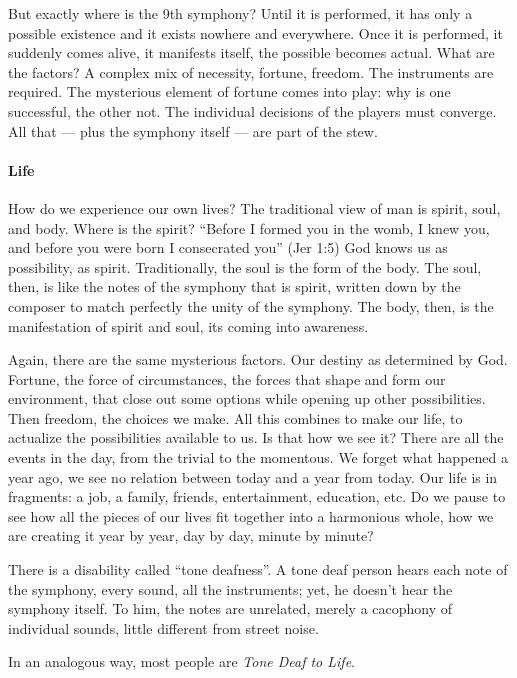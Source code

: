 But exactly where is the 9th symphony? Until it is performed, it has only a possible existence and it exists nowhere and everywhere. Once it is performed, it suddenly comes alive, it manifests itself, the possible becomes actual. What are the factors? A complex mix of necessity, fortune, freedom. The instruments are required. The mysterious element of fortune comes into play: why is one successful, the other not. The individual decisions of the players must converge. All that --- plus the symphony itself --- are part of the stew.

\paragraph{Life}


How do we experience our own lives? The traditional view of man is spirit, soul, and body. Where is the spirit? ``Before I formed you in the womb, I knew you, and before you were born I consecrated you'' (Jer 1:5) God knows us as possibility, as spirit. Traditionally, the soul is the form of the body. The soul, then, is like the notes of the symphony that is spirit, written down by the composer to match perfectly the unity of the symphony. The body, then, is the manifestation of spirit and soul, its coming into awareness.

Again, there are the same mysterious factors. Our destiny as determined by God. Fortune, the force of circumstances, the forces that shape and form our environment, that close out some options while opening up other possibilities. Then freedom, the choices we make. All this combines to make our life, to actualize the possibilities available to us. Is that how we see it? There are all the events in the day, from the trivial to the momentous. We forget what happened a year ago, we see no relation between today and a year from today. Our life is in fragments: a job, a family, friends, entertainment, education, etc. Do we pause to see how all the pieces of our lives fit together into a harmonious whole, how we are creating it year by year, day by day, minute by minute?

There is a disability called ``tone deafness''. A tone deaf person hears each note of the symphony, every sound, all the instruments; yet, he doesn't hear the symphony itself. To him, the notes are unrelated, merely a cacophony of individual sounds, little different from street noise.

In an analogous way, most people are \emph{Tone Deaf to Life}.



